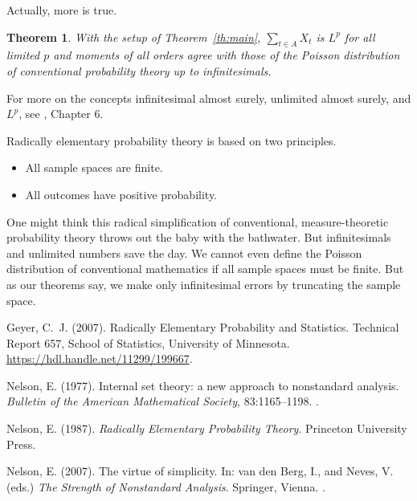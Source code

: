 \documentclass[11pt]{article}
\newtheorem{theorem}{Theorem}
\begin{document}
Actually, more is true.
\begin{theorem} \label{th:l-p}
With the setup of Theorem~\ref{th:main},
$\sum_{t \in A} X_t$ is $L^p$ for all limited $p$ and moments of all orders
agree with those of the Poisson distribution of conventional probability
theory up to infinitesimals.
\end{theorem}
For more on the concepts infinitesimal almost surely, unlimited almost surely,
and $L^p$, see \citet{geyer}, Chapter 6.

Radically elementary probability theory is based on two principles.
\begin{itemize}
\item All sample spaces are finite.
\item All outcomes have positive probability.
\end{itemize}
One might think this radical simplification of conventional, measure-theoretic
probability theory throws out the baby with the bathwater.  But infinitesimals
and unlimited numbers save the day.  We cannot even define the Poisson
distribution of conventional mathematics if all sample spaces must be finite.
But as our theorems say, we make only infinitesimal errors by truncating
the sample space.

\begin{thebibliography}{}

Geyer, C.~J. (2007).
\newblock Radically Elementary Probability and Statistics.
\newblock Technical Report 657, School of Statistics, University of Minnesota. 
\newblock \url{https://hdl.handle.net/11299/199667}.

Nelson, E. (1977).
\newblock Internal set theory: a new approach to nonstandard analysis.
\newblock \emph{Bulletin of the American Mathematical Society}, 83:1165--1198.
\newblock {}.

Nelson, E. (1987).
\newblock \emph{Radically Elementary Probability Theory}.
\newblock Princeton University Press.

Nelson, E. (2007).
\newblock The virtue of simplicity.
\newblock In: van den Berg, I., and Neves, V. (eds.)
    \emph{The Strength of Nonstandard Analysis}.
\newblock Springer, Vienna.
\newblock {}.

\end{thebibliography}
\end{document}
